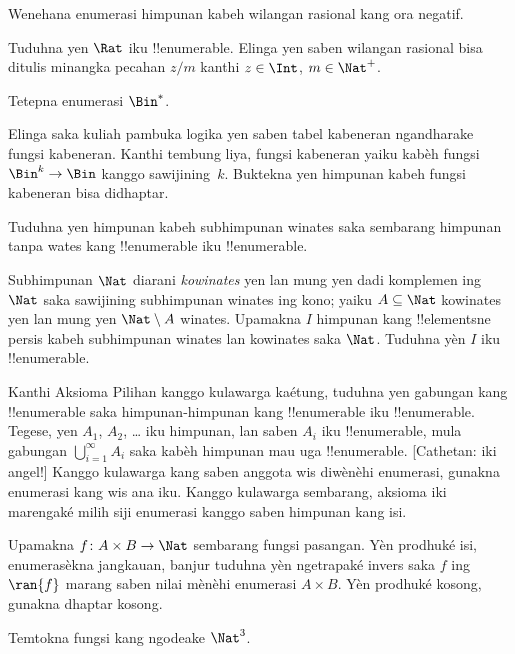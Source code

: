 \documentclass[../../../include/open-logic-section]{subfiles}
\begin{document}
\begin{prob}
Wenehana enumerasi himpunan kabeh wilangan rasional kang ora negatif.
\end{prob}

\begin{prob}
Tuduhna yen $\Rat$ iku !!{enumerable}. Elinga yen saben wilangan rasional
bisa ditulis minangka pecahan $z/m$ kanthi $z \in \Int$, $m \in \Nat^+$.
\end{prob}

\begin{prob}
Tetepna enumerasi $\Bin^*$.
\end{prob}

\begin{prob}
Elinga saka kuliah pambuka logika yen saben tabel kabeneran
ngandharake fungsi kabeneran. Kanthi tembung liya, fungsi kabeneran
yaiku kabèh fungsi $\Bin^k \to \Bin$ kanggo sawijining~$k$.
Buktekna yen himpunan kabeh fungsi kabeneran bisa didhaptar.
\end{prob}

\begin{prob}
Tuduhna yen himpunan kabeh subhimpunan winates saka sembarang
himpunan tanpa wates kang !!{enumerable} iku !!{enumerable}.
\end{prob}

\begin{prob}
Subhimpunan $\Nat$ diarani \emph{kowinates} yen lan mung yen dadi
komplemen ing $\Nat$ saka sawijining subhimpunan winates ing kono; yaiku $A \subseteq \Nat$
kowinates yen lan mung yen $\Nat\setminus A$ winates. Upamakna $I$ himpunan kang
!!{element}sne persis kabeh subhimpunan winates lan kowinates saka $\Nat$.
Tuduhna yèn $I$ iku !!{enumerable}.
\end{prob}

\begin{prob}
Kanthi Aksioma Pilihan kanggo kulawarga kaétung,
tuduhna yen gabungan kang !!{enumerable} saka himpunan-himpunan kang !!{enumerable}
iku !!{enumerable}. Tegese, yen $A_1$, $A_2$, \dots{} iku himpunan,
lan saben $A_i$ iku !!{enumerable}, mula gabungan $\bigcup_{i=1}^\infty
A_i$ saka kabèh himpunan mau uga !!{enumerable}. [Cathetan: iki angel!]
Kanggo kulawarga kang saben anggota wis diwènèhi enumerasi, gunakna
enumerasi kang wis ana iku. Kanggo kulawarga sembarang, aksioma iki
marengaké milih siji enumerasi kanggo saben himpunan kang isi.
\end{prob}

\begin{prob}
Upamakna $f \colon A \times B \to \Nat$ sembarang fungsi pasangan.
Yèn prodhuké isi, enumerasèkna jangkauan, banjur tuduhna yèn
ngetrapaké invers saka $f$ ing $\ran{f}$ marang saben nilai
mènèhi enumerasi $A \times B$. Yèn prodhuké kosong, gunakna dhaptar kosong.
\end{prob}

\begin{prob}
Temtokna fungsi kang ngodeake $\Nat^3$.
\end{prob}
\end{document}
